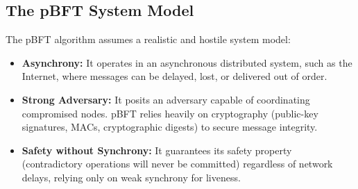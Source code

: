 \subsection{The pBFT System Model}
The pBFT algorithm assumes a realistic and hostile system model:
\begin{itemize}
    \item \textbf{Asynchrony:} It operates in an asynchronous distributed system, such as the Internet, where messages can be delayed, lost, or delivered out of order.
    \item \textbf{Strong Adversary:} It posits an adversary capable of coordinating compromised nodes. pBFT relies heavily on cryptography (public-key signatures, MACs, cryptographic digests) to secure message integrity.
    \item \textbf{Safety without Synchrony:} It guarantees its safety property (contradictory operations will never be committed) regardless of network delays, relying only on weak synchrony for liveness.
\end{itemize}
